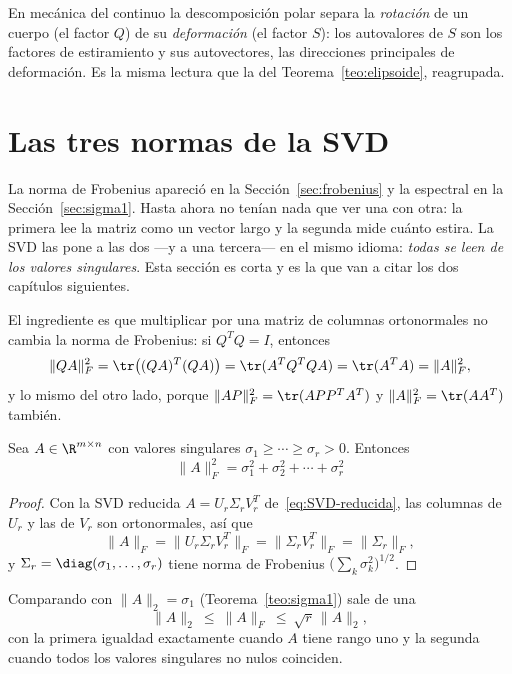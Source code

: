 \begin{remark}
En mecánica del continuo la descomposición polar separa la \emph{rotación} de
un cuerpo (el factor $Q$) de su \emph{deformación} (el factor $S$): los
autovalores de $S$ son los factores de estiramiento y sus autovectores, las
direcciones principales de deformación. Es la misma lectura que la del
Teorema~\ref{teo:elipsoide}, reagrupada.
\end{remark}

\section{Las tres normas de la SVD}
\label{sec:tres-normas}

La norma de Frobenius apareció en la Sección~\ref{sec:frobenius} y la
espectral en la Sección~\ref{sec:sigma1}. Hasta ahora no tenían nada que ver
una con otra: la primera lee la matriz como un vector largo y la segunda mide
cuánto estira. La SVD las pone a las dos ---y a una tercera--- en el mismo
idioma: \emph{todas se leen de los valores singulares}. Esta sección es corta
y es la que van a citar los dos capítulos siguientes.

El ingrediente es que multiplicar por una matriz de columnas ortonormales no
cambia la norma de Frobenius: si $Q^TQ=I$, entonces
\[
\|QA\|_F^2=\tr\bigl((QA)^T(QA)\bigr)=\tr(A^TQ^TQA)=\tr(A^TA)=\|A\|_F^2 ,
\]
y lo mismo del otro lado, porque $\|AP\|_F^2=\tr(APP^TA^T)$ y
$\|A\|_F^2=\tr(AA^T)$ también.

\begin{proposition}
\label{prop:frobenius-sigmas}
Sea $A\in\R^{m\times n}$ con valores singulares
$\sigma_1\ge\cdots\ge\sigma_r>0$. Entonces
\[
\boxed{\ \|A\|_F^2=\sigma_1^2+\sigma_2^2+\cdots+\sigma_r^2\ }
\]
\end{proposition}

\begin{proof}
Con la SVD reducida $A=U_r\Sigma_rV_r^T$ de~\eqref{eq:SVD-reducida}, las
columnas de $U_r$ y las de $V_r$ son ortonormales, así que
\[
\|A\|_F=\|U_r\Sigma_rV_r^T\|_F=\|\Sigma_rV_r^T\|_F=\|\Sigma_r\|_F ,
\]
y $\Sigma_r=\diag(\sigma_1,\dots,\sigma_r)$ tiene norma de Frobenius
$\bigl(\sum_k\sigma_k^2\bigr)^{1/2}$.
\end{proof}

Comparando con $\|A\|_2=\sigma_1$ (Teorema~\ref{teo:sigma1}) sale de una
\[
\|A\|_2\ \le\ \|A\|_F\ \le\ \sqrt{r}\,\|A\|_2 ,
\]
con la primera igualdad exactamente cuando $A$ tiene rango uno y la segunda
cuando todos los valores singulares no nulos coinciden.

